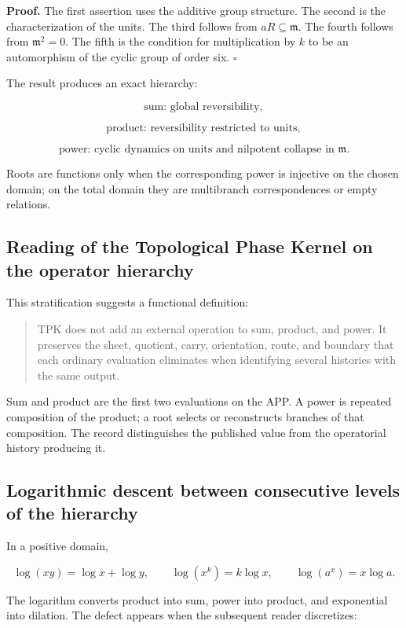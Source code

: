 \textbf{Proof.} The first assertion uses the additive group structure. The second is the characterization of the units. The third follows from \(aR\subseteq\mathfrak m\). The fourth follows from \(\mathfrak m^2=0\). The fifth is the condition for multiplication by \(k\) to be an automorphism of the cyclic group of order six. \(\square\)

The result produces an exact hierarchy:

\[
\text{sum: global reversibility},
\]

\[
\text{product: reversibility restricted to units},
\]

\[
\text{power: cyclic dynamics on units and nilpotent collapse in }\mathfrak m.
\]

Roots are functions only when the corresponding power is injective on the chosen domain; on the total domain they are multibranch correspondences or empty relations.

\subsection{Reading of the Topological Phase Kernel on the operator hierarchy}

This stratification suggests a functional definition:

\begin{quote}
TPK does not add an external operation to sum, product, and power. It preserves the sheet, quotient, carry, orientation, route, and boundary that each ordinary evaluation eliminates when identifying several histories with the same output.
\end{quote}

Sum and product are the first two evaluations on the APP. A power is repeated composition of the product; a root selects or reconstructs branches of that composition. The record distinguishes the published value from the operatorial history producing it.

\subsection{Logarithmic descent between consecutive levels of the hierarchy}

In a positive domain,

\[
\log(xy)=\log x+\log y,\qquad
\log(x^k)=k\log x,\qquad
\log(a^x)=x\log a.
\]

The logarithm converts product into sum, power into product, and exponential into dilation. The defect appears when the subsequent reader discretizes:

